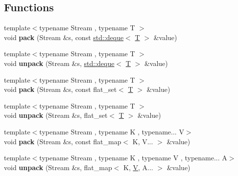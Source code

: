 \subsection*{Functions}
\begin{DoxyCompactItemize}
\item 
\mbox{\label{namespacefc_1_1raw_a3a18d8161aa5b4f4f02b6fcfdff5e5d1}} 
{\footnotesize template$<$typename Stream , typename T $>$ }\\void {\bfseries pack} (Stream \&s, const \mbox{\hyperlink{classstd_1_1deque}{std\+::deque}}$<$ \mbox{\hyperlink{struct_t}{T}} $>$ \&value)
\item 
\mbox{\label{namespacefc_1_1raw_a0b442d98ceb22dd5a6ae84745e43ffab}} 
{\footnotesize template$<$typename Stream , typename T $>$ }\\void {\bfseries unpack} (Stream \&s, \mbox{\hyperlink{classstd_1_1deque}{std\+::deque}}$<$ \mbox{\hyperlink{struct_t}{T}} $>$ \&value)
\item 
\mbox{\label{namespacefc_1_1raw_ae6ad9d88f02f6bd3eb935f00e72834bc}} 
{\footnotesize template$<$typename Stream , typename T $>$ }\\void {\bfseries pack} (Stream \&s, const flat\+\_\+set$<$ \mbox{\hyperlink{struct_t}{T}} $>$ \&value)
\item 
\mbox{\label{namespacefc_1_1raw_a51f872f1259cb0d02d32cec072bf8473}} 
{\footnotesize template$<$typename Stream , typename T $>$ }\\void {\bfseries unpack} (Stream \&s, flat\+\_\+set$<$ \mbox{\hyperlink{struct_t}{T}} $>$ \&value)
\item 
\mbox{\label{namespacefc_1_1raw_a185ae9aa201b9564fcb3a40ad6542477}} 
{\footnotesize template$<$typename Stream , typename K , typename... V$>$ }\\void {\bfseries pack} (Stream \&s, const flat\+\_\+map$<$ K, V... $>$ \&value)
\item 
\mbox{\label{namespacefc_1_1raw_a403e6d2e36fcdfb51ac0df043f079c5b}} 
{\footnotesize template$<$typename Stream , typename K , typename V , typename... A$>$ }\\void {\bfseries unpack} (Stream \&s, flat\+\_\+map$<$ K, \mbox{\hyperlink{struct_v}{V}}, A... $>$ \&value)

\end{DoxyCompactItemize}
